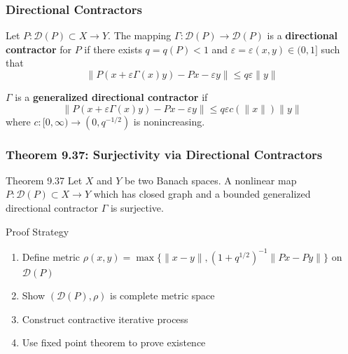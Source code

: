 \documentclass[aspectratio=169,10pt]{beamer}
\begin{document}
\begin{frame}
    \frametitle{Directional Contractors}

    \begin{definition}
        Let $P: \mathcal{D}(P) \subset X \to Y$. The mapping $\Gamma: \mathcal{D}(P) \to \mathcal{D}(P)$ is a \textbf{directional contractor} for $P$ if there exists $q = q(P) < 1$ and $\varepsilon = \varepsilon(x,y) \in (0,1]$ such that
        \[
        \|P(x + \varepsilon\Gamma(x)y) - Px - \varepsilon y\| \leq q\varepsilon\|y\|
        \]
    \end{definition}

    \bigskip

    \begin{definition}
        $\Gamma$ is a \textbf{generalized directional contractor} if
        \[
        \|P(x + \varepsilon\Gamma(x)y) - Px - \varepsilon y\| \leq q\varepsilon c(\|x\|)\|y\|
        \]
        where $c: [0,\infty) \to (0, q^{-1/2})$ is nonincreasing.
    \end{definition}
\end{frame}

\begin{frame}
    \frametitle{Theorem 9.37: Surjectivity via Directional Contractors}

    \begin{block}{Theorem 9.37}
        Let $X$ and $Y$ be two Banach spaces. A nonlinear map $P: \mathcal{D}(P) \subset X \to Y$ which has closed graph and a bounded generalized directional contractor $\Gamma$ is surjective.
    \end{block}

    \bigskip

    \begin{alertblock}{Proof Strategy}
        \begin{enumerate}
            \item Define metric $\rho(x,y) = \max\{\|x-y\|, (1+q^{1/2})^{-1}\|Px - Py\|\}$ on $\mathcal{D}(P)$
            \item Show $(\mathcal{D}(P), \rho)$ is complete metric space
            \item Construct contractive iterative process
            \item Use fixed point theorem to prove existence
        \end{enumerate}
    \end{alertblock}
\end{frame}
\end{document}
